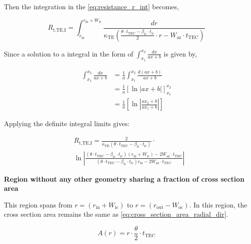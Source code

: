 \documentclass[10pt,a4paper,twocolumn]{article}
\begin{document}
Then the integration in the \cref{eq:resistance_r_int} becomes,

\begin{equation*}
	R_{\text{t,TE,I}} = \int_{r_{\text{in}}}^{r_{\text{in}}+W_{\text{ic}}} \frac{dr}{\kappa_{\text{TE}} \left( \frac{\theta \cdot t_{\text{TEC}}- \beta_{\text{ic}} \cdot t_{\text{ic}}}{2} \cdot r - W_{\text{az}} \cdot t_{\text{TEC}} \right)}
\end{equation*}

Since a solution to a integral in the form of $\int_{x_1}^{x_2} \frac{dx}{ax+b}$ is given by,

\begin{equation}
	\begin{aligned}
		\int_{x_1}^{x_2} \frac{dx}{ax+b} & = \frac{1}{a} \int_{x_1}^{x_2} \frac{d(ax+b)}{ax+b}                  \\
		                                 & = \frac{1}{a} \left[ \ln|ax+b| \right]_{x_1}^{x_2}                   \\
		                                 & = \frac{1}{a} \left[ \ln\left| \frac{ax_2+b}{ax_1+b} \right| \right]
	\end{aligned}
	\label{eq:ax_b_integral_result}
\end{equation}

Applying the definite integral limits gives:

\begin{equation}
	\begin{aligned}
		 & R_{\text{t,TE,I}} = \frac{2}{\kappa_{\text{TE}} (\theta \cdot t_{\text{TEC}}- \beta_{\text{ic}} \cdot t_{\text{ic}})} \cdot \\ & \ln \left| \frac{(\theta \cdot t_{\text{TEC}}- \beta_{\text{ic}} \cdot t_{\text{ic}})(r_{\text{in}}+W_{\text{ic}}) - 2 W_{\text{az}} \cdot t_{\text{TEC}}}{(\theta \cdot t_{\text{TEC}}- \beta_{\text{ic}} \cdot t_{\text{ic}})r_{\text{in}} - 2 W_{\text{az}} \cdot t_{\text{TEC}}} \right|
	\end{aligned}
	\label{eq:R_TE_I}
\end{equation}

\textbf{Region without any other geometry sharing  a fraction of cross section area}

This region spans from $r=(r_{\text{in}}+W_{\text{ic}})$ to $r=(r_{\text{out}}-W_{\text{oc}})$. In this region, the cross section area remains the same as \cref{eq:cross_section_area_radial_dir}.

\begin{equation*}
	A(r) = r \cdot \frac{\theta}{2} \cdot t_{\text{TEC}}
\end{equation*}
\end{document}
